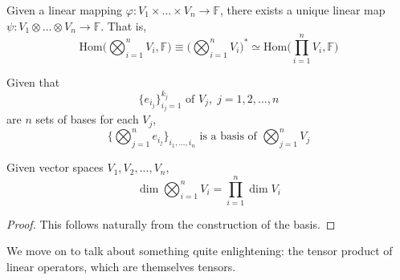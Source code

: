\documentclass{article}
\begin{document}
    \begin{proposition}
    Given a linear mapping $\varphi: V_1 \times ... \times V_n \longrightarrow \mathbb{F}$, there exists a unique linear map $\psi: V_1 \otimes ... \otimes V_n \longrightarrow \mathbb{F}$. That is, 
    \[\text{Hom}\Big( \bigotimes_{i=1}^n V_i, \mathbb{F} \Big) \equiv \bigg( \bigotimes_{i=1}^n V_i \bigg)^* \simeq \text{Hom}\Big(\prod_{i=1}^n V_i, \mathbb{F}\Big)\]
    \end{proposition}

    \begin{definition}
    Given that 
    \[ \{ e_{i_{j}}\}_{i_{j}=1}^{k_{j}} \text{ of } V_{j},\; j = 1, 2, ..., n\]
    are $n$ sets of bases for each $V_{j}$, 
    \[ \{ \bigotimes_{j=1}^{n} e_{i_{j}} \}_{i_{1}, ..., i_{n}} \text{ is a basis of } \bigotimes_{j=1}^{n} V_{j}\]
    \end{definition}

    \begin{proposition}
    Given vector spaces $V_1, V_2, ..., V_n$, 
    \[ \dim \bigotimes_{i=1}^{n} V_i = \prod_{i=1}^{n} \dim V_{i}\]
    \end{proposition}
    \begin{proof}
    This follows naturally from the construction of the basis.
    \end{proof}

    We move on to talk about something quite enlightening: the tensor product of linear operators, which are themselves tensors. 
\end{document}
